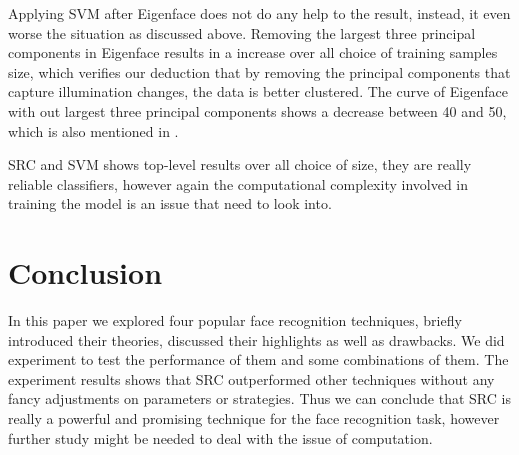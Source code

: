 \documentclass[conference]{IEEEtran}
\begin{document}
Applying SVM after Eigenface does not do any help to the result, instead, it even worse the situation as discussed above. Removing the largest three principal components in Eigenface results in a increase over all choice of training samples size, which verifies our deduction that by removing the principal components that capture illumination changes, the data is better clustered. The curve of Eigenface with out largest three principal components shows a decrease between 40 and 50, which is also mentioned in \cite{belhumeur1997eigenfaces}.

SRC and SVM shows top-level results over all choice of size, they are really reliable classifiers, however again the computational complexity involved in training the model is an issue that need to look into.

\section{Conclusion}
In this paper we explored four popular face recognition techniques, briefly introduced their theories, discussed their highlights as well as drawbacks. We did experiment to test the performance of them and some combinations of them. The experiment results shows that SRC outperformed other techniques without any fancy adjustments on parameters or strategies. Thus we can conclude that SRC is really a powerful and promising technique for the face recognition task, however further study might be needed to deal with the issue of computation.







\end{document}
